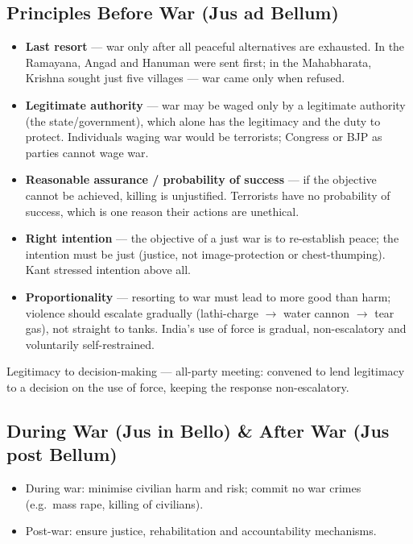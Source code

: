 \subsection{Principles Before War (Jus ad Bellum)}
\begin{itemize}
\item \textbf{Last resort} --- war only after all peaceful alternatives are exhausted. In the Ramayana, Angad and Hanuman were sent first; in the Mahabharata, Krishna sought just five villages --- war came only when refused.
\item \textbf{Legitimate authority} --- war may be waged only by a legitimate authority (the state/government), which alone has the legitimacy and the duty to protect. Individuals waging war would be terrorists; Congress or BJP as parties cannot wage war.
\item \textbf{Reasonable assurance / probability of success} --- if the objective cannot be achieved, killing is unjustified. Terrorists have no probability of success, which is one reason their actions are unethical.
\item \textbf{Right intention} --- the objective of a just war is to re-establish peace; the intention must be just (justice, not image-protection or chest-thumping). Kant stressed intention above all.
\item \textbf{Proportionality} --- resorting to war must lead to more good than harm; violence should escalate gradually (lathi-charge $\rightarrow$ water cannon $\rightarrow$ tear gas), not straight to tanks. India's use of force is gradual, non-escalatory and voluntarily self-restrained.
\end{itemize}

\begin{ExampleBox}
Legitimacy to decision-making --- all-party meeting: convened to lend legitimacy to a decision on the use of force, keeping the response non-escalatory.
\end{ExampleBox}

\subsection{During War (Jus in Bello) \& After War (Jus post Bellum)}
\begin{KeyConcept}
\begin{itemize}
\item During war: minimise civilian harm and risk; commit no war crimes (e.g.\ mass rape, killing of civilians).
\item Post-war: ensure justice, rehabilitation and accountability mechanisms.
\end{itemize}
\end{KeyConcept}

